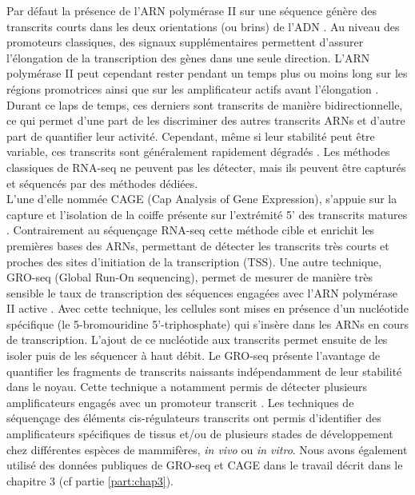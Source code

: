 Par défaut la présence de l'ARN polymérase II sur une séquence génère des transcrits courts dans les deux orientations (ou brins) de l'\acrshort{ADN} \citep{kim_widespread_2010, andersson_atlas_2014}. Au niveau des promoteurs classiques, des signaux supplémentaires permettent d'assurer l'élongation de la transcription des gènes dans une seule direction. L’ARN polymérase II peut cependant rester pendant un temps plus ou moins long sur les régions promotrices ainsi que sur les \gls{amplificateur} actifs avant l’élongation \citep{rougvie_rna_1988, mayer_pause_2017}. Durant ce laps de temps, ces derniers sont transcrits de manière bidirectionnelle, ce qui permet d'une part de les discriminer des autres transcrits \acrshort{ARN}s et d'autre part de quantifier leur activité. Cependant, même si leur stabilité peut être variable, ces transcrits sont généralement rapidement dégradés \citep{almada_promoter_2013}. Les méthodes classiques de \acrshort{RNA-seq} ne peuvent pas les détecter, mais ils peuvent être capturés et séquencés par des méthodes dédiées. \\

L’une d’elle nommée \acrshort{CAGE} (Cap Analysis of Gene Expression), s’appuie sur la capture et l’isolation de la coiffe présente sur l’extrémité 5’ des transcrits matures \citep{shiraki_cap_2003, andersson_atlas_2014}. Contrairement au séquençage \acrshort{RNA-seq} cette méthode cible et enrichit les premières bases des \acrshort{ARN}s, permettant de détecter les transcrits très courts et proches des sites d’initiation de la transcription (\acrshort{TSS}). Une autre technique, GRO-seq (Global Run-On sequencing), permet de mesurer de manière très sensible le taux de transcription des séquences engagées avec l’ARN polymérase II active \citep{core_nascent_2008}. Avec cette technique, les cellules sont mises en présence d’un nucléotide spécifique (le 5-bromouridine 5'-triphosphate) qui s'insère dans les \acrshort{ARN}s en cours de transcription. L'ajout de ce nucléotide aux transcrits permet ensuite de les isoler puis de les séquencer à haut débit. Le GRO-seq présente l’avantage de quantifier les fragments de transcrits naissants indépendamment de leur stabilité dans le noyau. Cette technique a notamment permis de détecter plusieurs \glspl{amplificateur} engagés avec un promoteur transcrit \citep{melgar_discovery_2011}. Les techniques de séquençage des éléments \gls{cis}-régulateurs transcrits ont permis d’identifier des \glspl{amplificateur} spécifiques de tissus et/ou de plusieurs stades de développement chez différentes espèces de mammifères, \textit{in vivo} ou \textit{in vitro}. Nous avons également utilisé des données publiques de GRO-seq et \acrshort{CAGE} dans le travail décrit dans le chapitre 3 (cf partie \ref{part:chap3}).

